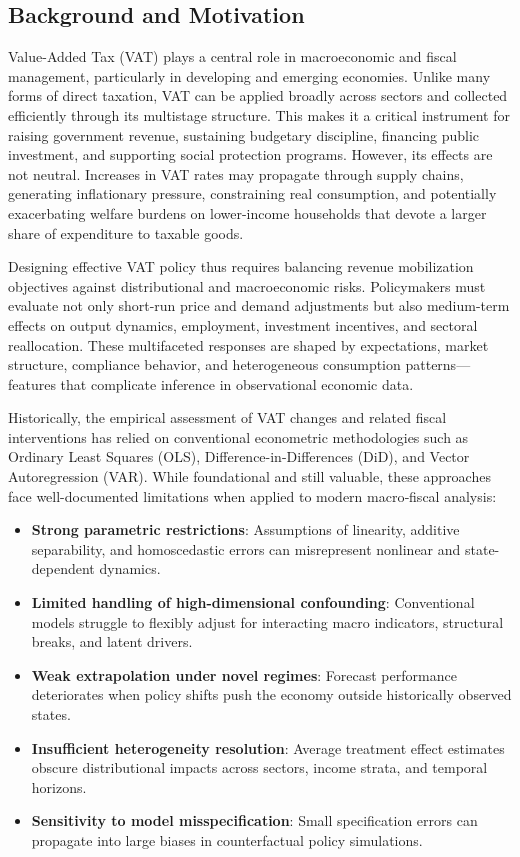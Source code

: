 \subsection{Background and Motivation}\label{sec:background}

Value-Added Tax (VAT) plays a central role in macroeconomic and fiscal management, particularly in developing and emerging economies. Unlike many forms of direct taxation, VAT can be applied broadly across sectors and collected efficiently through its multistage structure. This makes it a critical instrument for raising government revenue, sustaining budgetary discipline, financing public investment, and supporting social protection programs. However, its effects are not neutral. Increases in VAT rates may propagate through supply chains, generating inflationary pressure, constraining real consumption, and potentially exacerbating welfare burdens on lower-income households that devote a larger share of expenditure to taxable goods.

Designing effective VAT policy thus requires balancing revenue mobilization objectives against distributional and macroeconomic risks. Policymakers must evaluate not only short-run price and demand adjustments but also medium-term effects on output dynamics, employment, investment incentives, and sectoral reallocation. These multifaceted responses are shaped by expectations, market structure, compliance behavior, and heterogeneous consumption patterns—features that complicate inference in observational economic data.

Historically, the empirical assessment of VAT changes and related fiscal interventions has relied on conventional econometric methodologies such as Ordinary Least Squares (OLS), Difference-in-Differences (DiD), and Vector Autoregression (VAR). While foundational and still valuable, these approaches face well-documented limitations when applied to modern macro‑fiscal analysis:

\begin{itemize}
  \item \textbf{Strong parametric restrictions}: Assumptions of linearity, additive separability, and homoscedastic errors can misrepresent nonlinear and state-dependent dynamics.
  \item \textbf{Limited handling of high-dimensional confounding}: Conventional models struggle to flexibly adjust for interacting macro indicators, structural breaks, and latent drivers.
  \item \textbf{Weak extrapolation under novel regimes}: Forecast performance deteriorates when policy shifts push the economy outside historically observed states.
  \item \textbf{Insufficient heterogeneity resolution}: Average treatment effect estimates obscure distributional impacts across sectors, income strata, and temporal horizons.
  \item \textbf{Sensitivity to model misspecification}: Small specification errors can propagate into large biases in counterfactual policy simulations.
\end{itemize}

